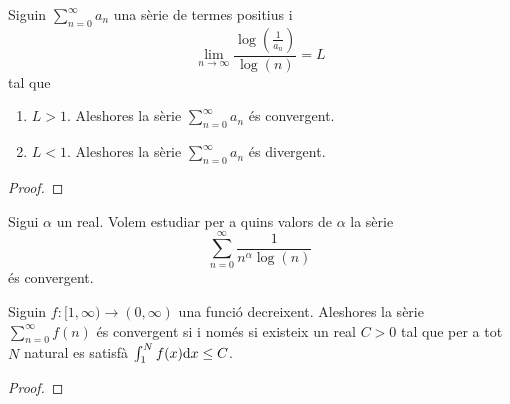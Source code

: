 \documentclass[../Apunts.tex]{subfiles}
\begin{document}
	\begin{proposition}
		\label{prop:criteri logarítmic}
		Siguin \(\sum_{n=0}^{\infty}a_{n}\) una sèrie de termes positius i
		\[\lim_{n\to\infty}\frac{\log\left(\frac{1}{a_{n}}\right)}{\log(n)}=L\]
		tal que
		\begin{enumerate}
			\item\label{prop:criteri logarítmic:enum1} \(L>1\). Aleshores la sèrie \(\sum_{n=0}^{\infty}a_{n}\) és convergent.
			\item\label{prop:criteri logarítmic:enum2} \(L<1\). Aleshores la sèrie \(\sum_{n=0}^{\infty}a_{n}\) és divergent.
		\end{enumerate}
		\begin{proof}
		\end{proof}
	\end{proposition}
	\begin{example}
		Sigui \(\alpha\) un real. Volem estudiar per a quins valors de \(\alpha\) la sèrie
		\[\sum_{n=0}^{\infty}\frac{1}{n^{\alpha}\log(n)}\]
		és convergent.
		\begin{solution}
		\end{solution}
	\end{example}
	\begin{proposition}
		\label{prop:criteri de la integral}
		Siguin \(f\colon[1,\infty)\longrightarrow(0,\infty)\) una funció decreixent. Aleshores la sèrie \(\sum_{n=0}^{\infty}f(n)\) és convergent si i només si existeix un real \(C>0\) tal que per a tot \(N\) natural es satisfà \(\int_{1}^{N}f(x)\textrm{d} x\leq C\).
		\begin{proof}
		\end{proof}
	\end{proposition}
\end{document}
